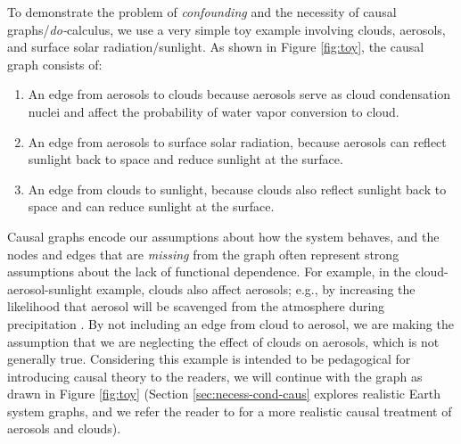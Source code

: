 \documentclass[12pt]{article}
\begin{document}
To demonstrate the problem of \textit{confounding} and the necessity
of causal graphs/\textit{do-}calculus, we use a very simple toy
example involving clouds, aerosols, and surface solar
radiation/sunlight. As shown in Figure \ref{fig:toy}, the causal
graph consists of:

\begin{enumerate}
\item An edge from aerosols to clouds because aerosols serve as cloud
  condensation nuclei and affect the probability of water vapor
  conversion to cloud.
\item An edge from aerosols to surface solar radiation, because
  aerosols can reflect sunlight back to space and reduce sunlight at
  the surface.
\item An edge from clouds to sunlight, because clouds also reflect
  sunlight back to space and can reduce sunlight at the surface.
\end{enumerate}

Causal graphs encode our assumptions about how the system behaves, and
the nodes and edges that are \textit{missing} from the graph often
represent strong assumptions about the lack of functional
dependence. For example, in the cloud-aerosol-sunlight example, clouds
also affect aerosols; e.g., by increasing the likelihood that aerosol
will be scavenged from the atmosphere during precipitation
\citep[e.g.,][]{radke-scavenge-1980, jurado2008,
  blanco-alegre2018}. By not including an edge from cloud to aerosol,
we are making the assumption that we are neglecting the effect of
clouds on aerosols, which is not generally true. Considering this
example is intended to be pedagogical for introducing causal theory to
the readers, we will continue with the graph as drawn in Figure
\ref{fig:toy} (Section \ref{sec:necess-cond-caus} explores realistic
Earth system graphs, and we refer the reader to \cite{gryspeerdt-2019}
for a more realistic causal treatment of aerosols and clouds).

\end{document}
